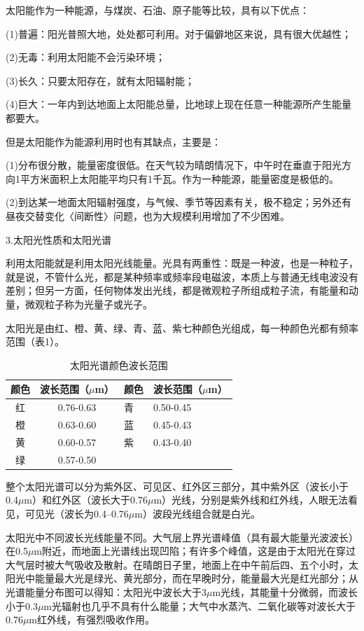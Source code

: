 \documentclass{ctexbook}
\begin{document}
太阳能作为一种能源，与煤炭、石油、原子能等比较，具有以下优点：

(1)普遍：阳光普照大地，处处都可利用。对于偏僻地区来说，具有很大优越性；

(2)无毒：利用太阳能不会污染环境；

(3)长久：只要太阳存在，就有太阳辐射能；

(4)巨大：一年内到达地面上太阳能总量，比地球上现在任意一种能源所产生能量都要大。

但是太阳能作为能源利用时也有其缺点，主要是：

(1)分布很分散，能量密度很低。在天气较为晴朗情况下，中午时在垂直于阳光方向1平方米面积上太阳能平均只有1千瓦。作为一种能源，能量密度是极低的。

(2)到达某一地面太阳辐射强度，与气候、季节等因素有关，极不稳定；另外还有昼夜交替变化〈间断性〉问题，也为大规模利用增加了不少困难。

3.太阳光性质和太阳光谱

利用太阳能就是利用太阳光线能量。光具有两重性：既是一种波，也是一种粒子，就是说，不管什么光，都是某种频率或频率段电磁波，本质上与普通无线电波没有差别；但另一方面，任何物体发出光线，都是微观粒子所组成粒子流，有能量和动量，微观粒子称为光量子或光子。

太阳光是由红、橙、黄、绿、青、蓝、紫七种颜色光组成，每一种颜色光都有频率范围（表1）。
\begin{table}[htbp]
	\centering
	\caption{太阳光谱颜色波长范围}
	\begin{tabular}{c|c|c|c}
		\hline
		颜色    & 波长范围（$\mu$m） & \multicolumn{1}{l}{颜色} & \multicolumn{1}{l}{波长范围（$\mu$m）} \\ \hline
		红     & 0.76-0.63 & \multicolumn{1}{l}{青} & \multicolumn{1}{l}{0.50-0.45} \\ \hline
		橙     & 0.63-0.60 & \multicolumn{1}{l}{蓝} & \multicolumn{1}{l}{0.45-0.43} \\ \hline
		黄     & 0.60-0.57 & \multicolumn{1}{l}{紫} & \multicolumn{1}{l}{0.43-0.40} \\ \hline
		绿     & 0.57-0.50 &       &  \\
		\hline
	\end{tabular}%
	\label{tab:bochang}%
\end{table}%
整个太阳光谱可以分为紫外区、可见区、红外区三部分，其中紫外区（波长小于0.4$\mu$m）和红外区（波长大于0.76$\mu$m）光线，分别是紫外线和红外线，人眼无法看见，可见光（波长为0.4--0.76$\mu$m）波段光线组合就是白光。

太阳光中不同波长光线能量不同。大气层上界光谱峰值（具有最大能量光波波长）在0.5$\mu$m附近，而地面上光谱线出现凹陷；有许多个峰值，这是由于太阳光在穿过大气层时被大气吸收及散射。在晴朗日子里，地面上在中午前后四、五个小时，太阳光中能量最大光是绿光、黄光部分，而在早晚时分，能量最大光是红光部分；从光谱能量分布图可以得知：太阳光中波长大于3$\mu$m光线，其能量十分微弱，而波长小于0.3$\mu$m光辐射也几乎不具有什么能量；大气中水蒸汽、二氧化碳等对波长大于0.76$\mu$m红外线，有强烈吸收作用。
\end{document}
